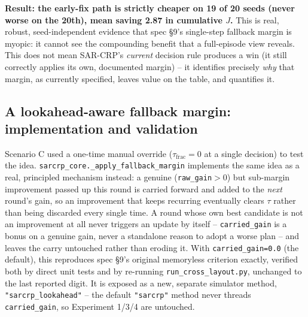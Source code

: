 \documentclass[11pt]{article}
\begin{document}
\textbf{Result: the early-fix path is strictly cheaper on 19 of 20 seeds
(never worse on the 20th), mean saving 2.87 in cumulative $J$.} This is
real, robust, seed-independent evidence that spec \S9's single-step
fallback margin is myopic: it cannot see the compounding benefit that a
full-episode view reveals. This does not mean SAR-CRP's \emph{current}
decision rule produces a win (it still correctly applies its own,
documented margin) -- it identifies precisely \emph{why} that margin, as
currently specified, leaves value on the table, and quantifies it.

\subsection{A lookahead-aware fallback margin: implementation and validation}
\label{sec:lookahead}

Scenario C used a one-time manual override ($\tau_{\text{frac}}=0$ at a
single decision) to test the idea. \texttt{sarcrp\_core.\_apply\_fallback\_margin}
implements the same idea as a real, principled mechanism instead: a
genuine (\texttt{raw\_gain}$>0$) but sub-margin improvement passed up this
round is carried forward and added to the \emph{next} round's gain, so an
improvement that keeps recurring eventually clears $\tau$ rather than
being discarded every single time. A round whose own best candidate is
not an improvement at all never triggers an update by itself --
\texttt{carried\_gain} is a bonus on a genuine gain, never a standalone
reason to adopt a worse plan -- and leaves the carry untouched rather than
eroding it. With \texttt{carried\_gain=0.0} (the default), this reproduces
spec \S9's original memoryless criterion exactly, verified both by direct
unit tests and by re-running \texttt{run\_cross\_layout.py}, unchanged to
the last reported digit. It is exposed as a new, separate simulator
method, \texttt{"sarcrp\_lookahead"} -- the default \texttt{"sarcrp"}
method never threads \texttt{carried\_gain}, so Experiment 1/3/4 are
untouched.
\end{document}
